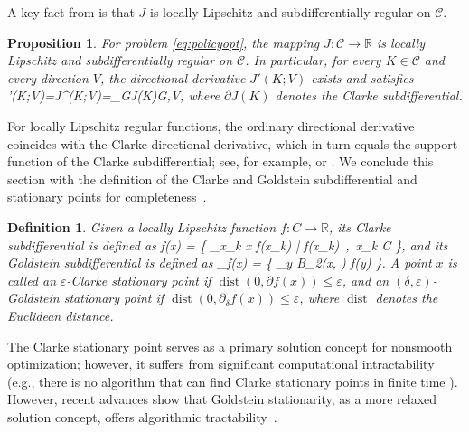 \documentclass[letterpaper,10pt,conference]{ieeeconf}
\def\[#1\]{\begin{align*}#1\end{align*}}
\providecommand{\R}{\mathbb{R}}
\providecommand{\cC}{\mathcal{C}}
\providecommand{\distop}{\operatorname{dist}}
\providecommand{\inner}[2]{\left\langle #1,#2\right\rangle}
\renewcommand{\^}[1]{^{(#1)}}
\newtheorem{proposition}[theorem]{Proposition}
\newtheorem{definition}[theorem]{Definition}
\begin{document}
A key fact from \citet[Proposition~1]{tang2023global} is that $J$ is locally Lipschitz and subdifferentially regular on $\cC$.

\begin{proposition}\label{prop:TZ-regular}
For problem \eqref{eq:policyopt}, the mapping $J:\cC\to\R$ is locally Lipschitz and subdifferentially regular on $\cC$. In particular, for every $K\in\cC$ and every direction $V$, the directional derivative $J'(K;V)$ exists and satisfies
\[
J'(K;V)=J^{\circ}(K;V)=\max_{G\in\partial J(K)}\inner{G}{V},
\]
where $\partial J(K)$ denotes the Clarke subdifferential.
\end{proposition}

For locally Lipschitz regular functions, the ordinary directional derivative coincides with the Clarke directional derivative, which in turn equals the support function of the Clarke subdifferential; see, for example, \citep[Section~2.3]{clarke1990optimization} or \citep[Chapter~8]{rockafellar1998variational}. We conclude this section with the definition of the Clarke and Goldstein subdifferential and stationary points for completeness~\citep{clarke1990optimization,goldstein1977optimization}.

\begin{definition}
    Given a locally Lipschitz function $f:C \rightarrow \mathbb{R}$, its Clarke subdifferential is defined as
    \[
    \partial f(x)
    =
    \left\{
    \lim_{x_k \to x} \nabla f(x_k)
    \;\middle|\;
    \nabla f(x_k)\ ,\ x_k \in \mathcal C
    \right\},
    \]
    and its Goldstein subdifferential is defined as
    \[
    \partial_\delta f(x)
    =
      \left\{
    \bigcup_{y \in B_2(x, \delta)} \partial f(y)
    \right\}.
    \]
    A point $x$ is called an $\varepsilon$-Clarke stationary point if $\distop(0, \partial f(x)) \leq \varepsilon$, and an $(\delta, \varepsilon)$-Goldstein stationary point if $\distop(0, \partial_\delta f(x)) \leq \varepsilon$, where $\distop$ denotes the Euclidean distance.
\end{definition}

The Clarke stationary point serves as a primary solution concept for nonsmooth optimization; however, it suffers from significant computational intractability (e.g., there is no algorithm that can find Clarke stationary points in finite time \citep[Theorem~5]{zhang2020complexity}). However, recent advances show that Goldstein stationarity, as a more relaxed solution concept, offers algorithmic tractability~\citep{zhang2020complexity,davis2022gradient}.
\end{document}
